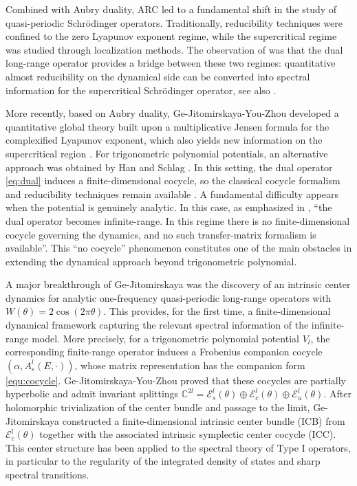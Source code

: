 \documentclass[reqno,11pt]{amsart}
\begin{document}
Combined with Aubry duality, ARC led to a fundamental shift in the study of quasi-periodic Schr\"odinger operators. 
Traditionally, reducibility techniques were confined to the zero Lyapunov exponent regime, while the supercritical regime was studied through localization methods. The observation of \cite{AYZ,AYZ2} was that the dual long-range operator provides a bridge between these two regimes: quantitative almost reducibility on the dynamical side can be converted into spectral information for the supercritical Schr\"odinger operator, see also \cite{GY,GYZ22,GYZ23,GYZ24,LYZZ}.


More recently, based on Aubry duality, Ge-Jitomirskaya-You-Zhou \cite{GJYZ} developed a quantitative global theory built upon a multiplicative Jensen formula for the complexified Lyapunov exponent, which also yields new information on the supercritical region \cite{GJY,GJ,LXZ}. For trigonometric polynomial potentials, an alternative approach was  obtained by Han and Schlag \cite{HS4}. In this setting, the dual operator \eqref{eq:dual} induces a finite-dimensional cocycle, so the classical cocycle formalism and reducibility techniques remain available \cite{GJY,GJ,GYZ22,LXZ,WXYZ,WXZ}. A fundamental difficulty appears when the potential is genuinely analytic. In this case, as emphasized in \cite{GJ}, ``the dual operator becomes infinite-range. In this regime there is no finite-dimensional cocycle governing the dynamics, and no such transfer-matrix formalism is available''.
This ``no cocycle'' phenomenon constitutes one of the main obstacles in extending the dynamical approach beyond trigonometric polynomial. 



A major breakthrough of Ge-Jitomirskaya \cite{GJ} was the discovery of an intrinsic center dynamics for analytic one-frequency quasi-periodic long-range operators with
$W(\theta)=2\cos(2\pi\theta).$
This provides, for the first time, a finite-dimensional dynamical framework capturing the relevant spectral information of the infinite-range model. 
 More precisely, for a trigonometric polynomial potential $V_l$, the corresponding finite-range operator induces a Frobenius companion cocycle $(\alpha,A^{l}_{\varepsilon}(E,\cdot))$, whose matrix representation has the companion form \eqref{equ:cocycle}.
 Ge-Jitomirskaya-You-Zhou \cite{GJYZ} proved that these cocycles are partially hyperbolic and admit invariant splittings
$
\mathbb C^{2l}=\mathcal E_s^l(\theta)\oplus\mathcal E_c^l(\theta)\oplus\mathcal E_u^l(\theta).
$
After holomorphic trivialization of the center bundle and passage to the limit, Ge-Jitomirskaya \cite{GJ} constructed a finite-dimensional intrinsic center bundle (ICB) from $\mathcal E_c^l(\theta)$ together with the associated intrinsic symplectic center cocycle (ICC). This center structure  has been applied to the spectral theory of Type I operators, in particular to the regularity of the integrated density of states and sharp spectral transitions.  
\end{document}
